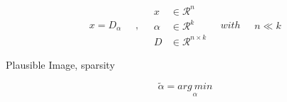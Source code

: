 \begin{equation}\label{cs:sparseland}
\begin{split}
x  =  D_{\alpha}
\end{split}
\quad , \quad
\begin{split}
x &\in \mathcal{R}^n\\
\alpha &\in \mathcal{R}^k\\
D &\in \mathcal{R}^{n \times k}
\end{split}
\quad with \quad
\begin{split}
n \ll k
\end{split}
\end{equation}

Plausible Image, sparsity

\begin{equation}\label{cs:noiseless}
\tilde{\alpha} =  \underset{\alpha}{arg\: min}
\end{equation}

